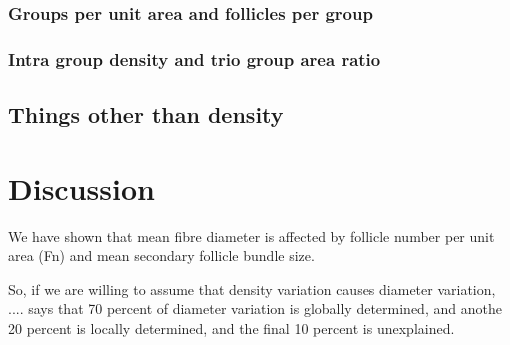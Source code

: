 \documentclass[titlepage]{article}  %
\begin{document}
\subsubsection{Groups per unit area and follicles per group}
\subsubsection{Intra group density and trio group area ratio}

\subsection{Things other than density}


\clearpage
\section{Discussion}
We have shown that mean fibre diameter is affected by follicle number per unit area (Fn) and mean secondary follicle bundle size. 

So, if we are willing to assume that density variation causes diameter variation,  .... says that 70 percent of diameter variation is globally determined, and anothe 20 percent is locally determined, and the final 10 percent is unexplained. 



\clearpage
\end{document}
